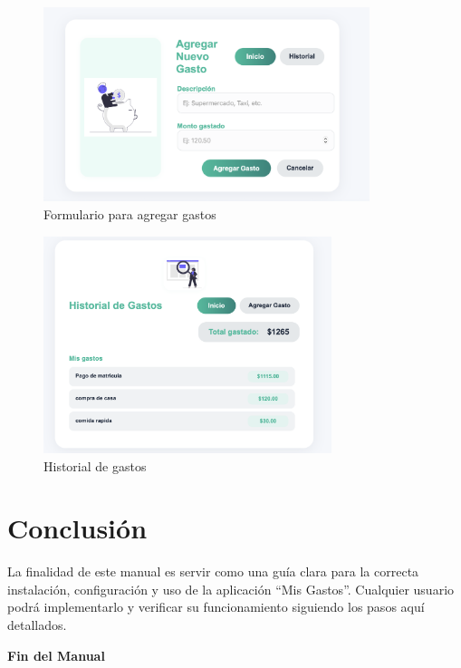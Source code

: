 \documentclass[12pt,a4paper]{article}
\begin{document}
\begin{figure}[H]
    \centering
    \includegraphics[width=0.85\textwidth]{Imagenes/Formulario.png}
    \caption{Formulario para agregar gastos}
\end{figure}

\begin{figure}[H]
    \centering
    \includegraphics[width=0.75\textwidth]{Imagenes/Historial de gastos.png}
    \caption{Historial de gastos}
\end{figure}
    
\section{Conclusión}

La finalidad de este manual es servir como una guía clara para la correcta instalación, configuración y uso de la aplicación “Mis Gastos”. Cualquier usuario podrá implementarlo y verificar su funcionamiento siguiendo los pasos aquí detallados.

\vfill
\begin{center}
    \textbf{ Fin del Manual }
\end{center}
\end{document}
